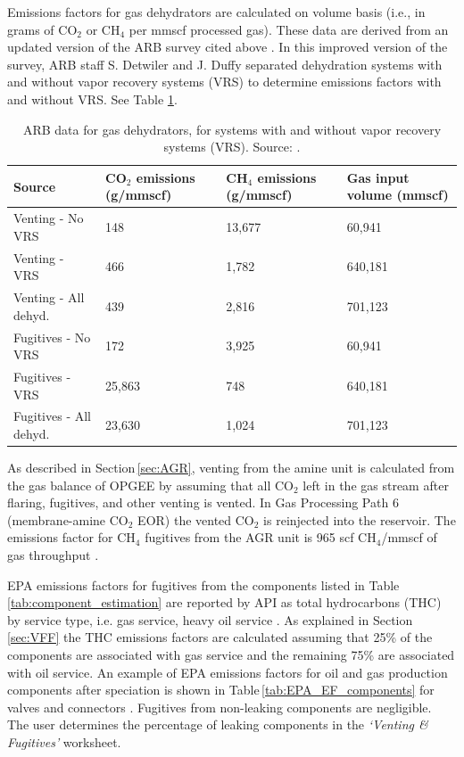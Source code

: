 \documentclass[11pt]{report}
\newcommand{\sheet}[1]{\textit{`{#1}'}}
\begin{document}
Emissions factors for gas dehydrators are calculated on volume basis (i.e., in grams of CO$_2$ or CH$_4$ per mmscf processed gas). These data are derived from an updated version of the ARB survey cited above \cite{ARB2013}. In this improved version of the survey, ARB staff S. Detwiler and J. Duffy separated dehydration systems with and without vapor recovery systems (VRS) to determine emissions factors with and without VRS. See Table \ref{tab:ARB_dehydrators_EF}.


\begin{table}
\begin{scriptsize}
\caption{ARB data for gas dehydrators, for systems with and without vapor recovery systems (VRS). Source: \cite{ARB2013}.}
\label{tab:ARB_dehydrators_EF}
\begin{threeparttable}
\begin{tabular*}{0.9\columnwidth}{p{}p{}p{}p{}}
\toprule
Source & CO$_{2}$ emissions (g/mmscf) & CH$_{4}$ emissions (g/mmscf) & Gas input volume (mmscf) \\
\midrule
Venting - No VRS & 148 & 13,677 & 60,941 \\ 
Venting - VRS & 466 & 1,782 & 640,181 \\
Venting - All dehyd. & 439 & 2,816 & 701,123 \\
\midrule
Fugitives - No VRS & 172 & 3,925 & 60,941 \\
Fugitives - VRS & 25,863 & 748 & 640,181 \\ 
Fugitives - All dehyd. & 23,630 & 1,024 & 701,123 \\
\bottomrule
\end{tabular*}
\end{threeparttable}
\end{scriptsize}
\end{table}



As described in Section\,\ref{sec:AGR}, venting from the amine unit is calculated from the gas balance of OPGEE by assuming that all CO$_{2}$ left in the gas stream after flaring, fugitives, and other venting is vented. In Gas Processing Path 6 (membrane-amine CO$_2$ EOR) the vented CO$_2$ is reinjected into the reservoir. The emissions factor for CH$_{4}$ fugitives from the AGR unit is 965 scf CH$_{4}$/mmscf of gas throughput \cite[p. 23]{EPA1996}. 

EPA emissions factors for fugitives from the components listed in Table\,\ref{tab:component_estimation} are reported by API as total hydrocarbons (THC) by service type, i.e. gas service, heavy oil service \cite[p. 20]{API1996b}. As explained in Section\,\ref{sec:VFF} the THC emissions factors are calculated assuming that 25\% of the components are associated with gas service and the remaining 75\% are associated with oil service. An example of EPA emissions factors for oil and gas production components after speciation is shown in Table\,\ref{tab:EPA_EF_components} for valves and connectors \cite[p. 20]{API1996b}. Fugitives from non-leaking components are negligible. The user determines the percentage of leaking components in the \sheet{Venting \& Fugitives} worksheet. 
\end{document}
